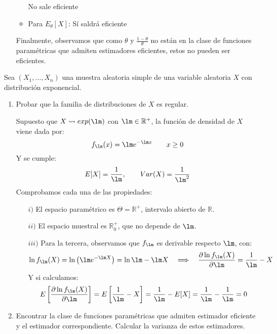 \begin{ejercicio}
\begin{enumerate}[label=\alph*)]
\begin{itemize}
\begin{equation*}
                    \end{equation*}
                    No sale eficiente
                \item Para $E_\theta[X]$:
                    Sí saldrá eficiente
            \end{itemize}
        Finalmente, observamos que como $\theta$ y $\frac{1-\theta}{\theta}$ no están en la clase de funciones paramétricas que admiten estimadores eficientes, estos no pueden ser eficientes.
    \end{enumerate}
\end{ejercicio}

\begin{ejercicio}\label{ej:9_rel4} 
    Sea $(X_1, \ldots, X_n)$ una muestra aleatoria simple de una variable aleatoria $X$ con distribución exponencial.
    \begin{enumerate}[label=\alph*)]
        \item Probar que la familia de distribuciones de $X$ es regular.

            Supuesto que $X\rightsquigarrow exp(\lm)$ con $\lm\in \mathbb{R}^+$, la función de densidad de $X$ viene dada por:
            \begin{equation*}
                f_\lm(x) = \lm e^{-\lm x} \qquad x\geq 0
            \end{equation*}
            Y se cumple:
            \begin{equation*}
                E[X] = \frac{1}{\lm}, \qquad Var(X) = \frac{1}{\lm^2}
            \end{equation*}
            Comprobamos cada una de las propiedades:
            \begin{enumerate}
                \item[$i)$] El espacio paramétrico es $\Theta=\mathbb{R}^+$, intervalo abierto de $\mathbb{R}$.
                \item[$ii)$] El espacio muestral es $\mathbb{R}^+_0$, que no depende de $\lm$.
                \item[$iii)$] Para la tercera, observamos que $f_\lm$ es derivable respecto $\lm$, con:
                    \begin{equation*}
                        \ln f_\lm(X) = \ln\left(\lm e^{-\lm X}\right) = \ln\lm - \lm X \quad \Longrightarrow \quad  \dfrac{\partial \ln f_\lm(X)}{\partial \lm} = \frac{1}{\lm} - X
                    \end{equation*}
                    Y si calculamos:
                    \begin{equation*}
                        E\left[\dfrac{\partial \ln f_\lm(X)}{\partial \lm}\right] = E\left[\frac{1}{\lm}-X\right] = \frac{1}{\lm}-E[X] = \frac{1}{\lm}-\frac{1}{\lm} = 0
                    \end{equation*}
            \end{enumerate}
        \item Encontrar la clase de funciones paramétricas que admiten estimador eficiente y el estimador correspondiente. Calcular la varianza de estos estimadores.


\end{enumerate}
\end{ejercicio}
